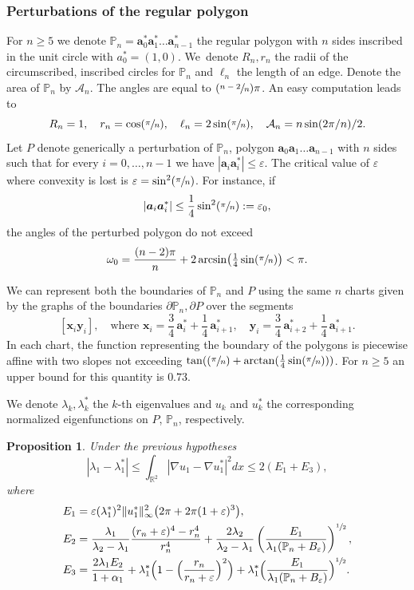 \documentclass[JEP,XML,SOM,Unicode,ThmDefs,NoFloatCountersInSection,published]{cedram}
\newcommand{\Psfrac}[2]{(\sfrac{#1}{#2})}
\theoremstyle{plain}
\newtheorem{propo}[thm]{Proposition}
\theoremstyle{definition}
\newcommand{\bo}[1]{{\boldsymbol#1}}
\let\Bbb\mathbb
\def\R{\mathbb{R}}
\newcommand{\vps}{\varepsilon}
\newcommand{\lb}{\lambda}
\begin{document}
\subsubsection*{Perturbations of the regular polygon}
For $n \ge 5$ we denote $\mathbb P_n=\bo a_0^* \bo a_1^* \dots \bo a_{n-1}^*$ the regular polygon with $n$ sides inscribed in the unit circle with $a_0^*=(1,0)$. We~denote $R_n, r_n$ the radii of the circumscribed, inscribed circles for $\mathbb P_n$ and $\ell_n$ the length of an edge. Denote the area of $\Bbb P_n$ by $\mathcal A_n$. The angles are equal to $\Psfrac{n-2}{n}\pi$.
An easy computation leads to
\[
R_n=1,\quad r_n = \cos \Psfrac{\pi}{n},\quad  \ell_n = 2 \sin \Psfrac{\pi}{n},\quad  \mathcal A_n = n\sin (2\pi/n)/2.
\]
Let $P$ denote generically a perturbation of $\mathbb P_n$, \ie polygon $\bo a_0 \bo a_1\dots \bo a_{n-1}$ with $n$ sides such that for every $i=0, \dots, n-1$ we have $|\bo a_i\bo a^*_i|\le \vps$. The critical value of $\vps$ where convexity is lost is $\vps= \sin^2 \Psfrac {\pi}{n}$. For instance, if
\[
|\bo a_i\bo a_i^*|\le \frac 14 \sin^2 \Psfrac{\pi}{n}:= \vps_0,
\]
the angles of the perturbed polygon do not exceed
\[
\omega_{0} = \frac{(n-2)\pi}{n} +2 \arcsin \bigl(\tfrac 14 \sin \Psfrac{\pi}{n}\bigr)<\pi.
\]

We can represent both the boundaries of $\Bbb P_n$ and $P$ using the same $n$ charts given by the graphs of the boundaries $\partial \Bbb P_n, \partial P$ over the segments
\[
[\bo x_i \bo y_{i}],\quad\text{where } \bo x_i = \frac 34\, \bo a_i^*+\frac 14\, \bo a_{i+1}^*,\quad \bo y_i= \frac 34\, \bo a_{i+2}^*+\frac 14\, \bo a_{i+1}^*.
\]
In each chart, the function representing the boundary of the polygons is piecewise affine with two slopes not exceeding $\tan (\Psfrac{\pi}{n}+ \arctan (\frac 14 \sin \Psfrac{\pi}{n}))$. For $n \ge 5$ an upper bound for this quantity is $ 0.73 $.

We denote $\lb_k, \lb_k^*$ the $k$-th eigenvalues and $u_k$ and $u_k^*$ the corresponding normalized eigenfunctions on $P$, $\Bbb P_n$, respectively.
\begin{propo}\label{bb03}
Under the previous hypotheses
\begin{equation}\label{bb04}
|\lb_1 -\lb_1^*|\le \int_{\R^2} |\nabla u_1 -\nabla u_1^* |^2 dx \le 2(E_1+E_3),
\end{equation}
where
\begin{align*}
E_1 &= \vps (\lb_1^*)^2 \|u_1^*\|_\infty^2 \big (2\pi+2\pi(1+\varepsilon)^3
\big),
\\
E_2&= \frac{\lb_1}{\lb_2-\lb_1}\frac{(r_n+\vps)^4-r_n^4}{r_n^4} + \frac{2\lb_2}{\lb_2-\lb_1}\left (\frac{E_1}{\lb_1(\Bbb P_n+ B_\vps)}\right)^{\sfrac12},
\\
E_3&=\frac{2 \lb_1 E_2}{1+\alpha_1}+\lb_1^*\Bigl(1- \Bigl(\frac{r_n}{r_n+\vps}\Bigr)^2\Bigr)+\lb_1^* \Bigl(\frac{E_1}{\lb_1(\Bbb P_n + B_\vps)}\Bigr)^{\sfrac12}.
\end{align*}
\end{propo}
\end{document}

